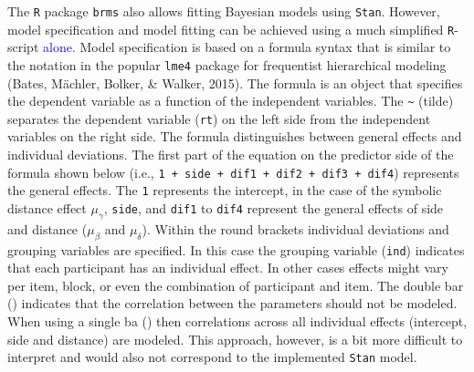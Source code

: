 \documentclass[
  english,
  doc,floatsintext]{apa6}
\begin{document}
The \texttt{R} package \texttt{brms} also allows fitting Bayesian models using \texttt{Stan}. However, model specification and model fitting can be achieved using a much simplified \texttt{R}-script \textcolor{blue}{alone}. Model specification is based on a formula syntax that is similar to the notation in the popular \texttt{lme4} package for frequentist hierarchical modeling (Bates, Mächler, Bolker, \& Walker, 2015). The formula is an object that specifies the dependent variable as a function of the independent variables. The \texttt{\textasciitilde{}} (tilde) separates the dependent variable (\texttt{rt}) on the left side from the independent variables on the right side. The formula distinguishes between general effects and individual deviations. The first part of the equation on the predictor side of the formula shown below (i.e., \texttt{1\ +\ side\ +\ dif1\ +\ dif2\ +\ dif3\ +\ dif4}) represents the general effects. The \texttt{1} represents the intercept, in the case of the symbolic distance effect \(\mu_{\gamma}\), \texttt{side}, and \texttt{dif1} to \texttt{dif4} represent the general effects of side and distance (\(\mu_{\beta}\) and \(\mu_{\delta}\)). Within the round brackets individual deviations and grouping variables are specified. In this case the grouping variable (\texttt{ind}) indicates that each participant has an individual effect. In other cases effects might vary per item, block, or even the combination of participant and item. The double bar (\texttt{\textbar{}\textbar{}}) indicates that the correlation between the parameters should not be modeled. When using a single ba (\texttt{\textbar{}}) then correlations across all individual effects (intercept, side and distance) are modeled. This approach, however, is a bit more difficult to interpret and would also not correspond to the implemented \texttt{Stan} model.

\scriptsize
\end{document}
